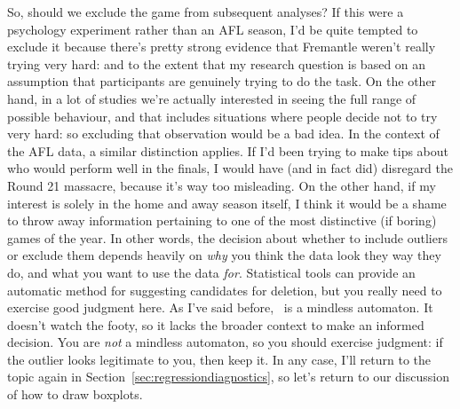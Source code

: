 So, should we exclude the game from subsequent analyses? If this were a psychology experiment rather than an AFL season, I'd be quite tempted to exclude it because there's pretty strong evidence that Fremantle weren't really trying very hard: and to the extent that my research question is based on an assumption that participants are genuinely trying to do the task. On the other hand, in a lot of studies we're actually interested in seeing the full range of possible behaviour, and that includes situations where people decide not to try very hard: so excluding that observation would be a bad idea. In the context of the AFL data, a similar distinction applies. If I'd been trying to make tips about who would perform well in the finals, I would have (and in fact did) disregard the Round 21 massacre, because it's way too misleading. On the other hand, if my interest is solely in the home and away season itself, I think it would be a shame to throw away information pertaining to one of the most distinctive (if boring) games of the year. In other words, the decision about whether to include outliers or exclude them depends heavily on {\it why} you think the data look they way they do, and what you want to use the data {\it for}. Statistical tools can provide an automatic method for suggesting candidates for deletion, but you really need to exercise good judgment here. As I've said before, \R\ is a mindless automaton. It doesn't watch the footy, so it lacks the broader context to make an informed decision. You are {\it not} a mindless automaton, so you should exercise judgment: if the outlier looks legitimate to you, then keep it. In any case, I'll return to the topic again in Section~\ref{sec:regressiondiagnostics}, so let's return to our discussion of how to draw boxplots.



